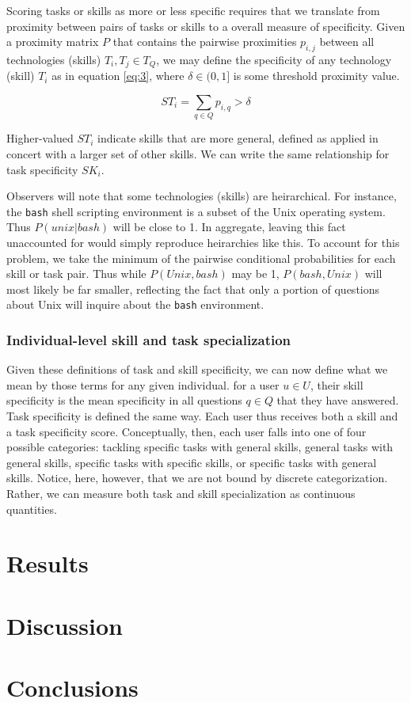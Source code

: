 \documentclass[11pt]{article}
\begin{document}
Scoring tasks or skills as more or less specific requires that we
translate from proximity between pairs of tasks or skills to a overall
measure of specificity. Given a proximity matrix $P$ that contains the
pairwise proximities $p_{i,j}$ between all technologies (skills) $T_i, T_j \in T_Q$, we may define the
specificity of any technology (skill) $T_i$ as in equation \ref{eq:3}, where
$\delta \in (0,1]$ is some threshold proximity value.

\begin{equation}
  \label{eq:3}
  ST_i = \sum_{q \in Q} p_{i,q} > \delta 
\end{equation}

Higher-valued $ST_i$ indicate skills that are more general, defined as
applied in concert with a larger set of other skills. We can write the
same relationship for task specificity $SK_i$.

Observers will note that some technologies (skills) are
heirarchical. For instance, the \texttt{bash} shell scripting
environment is a subset of the Unix operating system. Thus $P(unix |
bash)$ will be close to 1. In aggregate, leaving this fact unaccounted
for would simply reproduce heirarchies like this. To account for this
problem, we take the minimum of the pairwise conditional probabilities
for each skill or task pair. Thus while $P(Unix, bash)$ may be 1,
$P(bash, Unix)$ will most likely be far smaller, reflecting the fact
that only a portion of questions about Unix will inquire about the
\texttt{bash} environment.

\subsubsection{Individual-level skill and task specialization}
\label{sec:indiv-level-skill}

Given these definitions of task and skill specificity, we can now
define what we mean by those terms for any given individual. for a
user $u \in U$, their skill specificity is the mean specificity in all
questions $q \in Q$ that they have answered. Task specificity is
defined the same way. Each user thus receives both a skill and a task
specificity score. Conceptually, then, each user falls into one of
four possible categories: tackling specific tasks with general skills,
general tasks with general skills, specific tasks with specific
skills, or specific tasks with general skills. Notice, here, however,
that we are not bound by discrete categorization. Rather, we can
measure both task and skill specialization as continuous quantities.

\section{Results}
\label{sec:results}

\section{Discussion}
\label{sec:discussion}

\section{Conclusions}
\label{sec:conclusions}


\FloatBarrier


\end{document}
